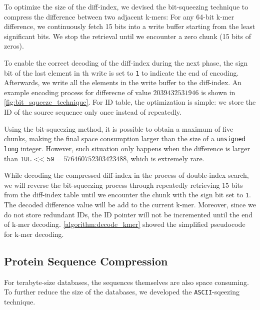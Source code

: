 To optimize the size of the diff-index, we devised the bit-squeezing technique to compress the difference between two adjacent k-mers:
For any 64-bit k-mer difference, we continuously fetch 15 bits into a write buffer starting from the least significant bits. We stop the retrieval until we encounter a zero chunk (15 bits of zeros).

To enable the correct decoding of the diff-index during the next phase, the sign bit of the last element in th write is set to \texttt{1} to indicate the end of encoding. Afterwards, we write all the elements in the write buffer to the diff-index. An example encoding process for differecne of value $2039432531946$ is shown in \autoref{fig:bit_squeeze_technique}. For ID table, the optimization is simple: we store the ID of the source sequence only once instead of repeatedly.

Using the bit-squeezing method, it is possible to obtain a maximum of five chunks, making the final space consumption larger than the size of a \texttt{unsigned long} integer. However, such situation only happens when the difference is larger than $\texttt{1UL << 59} = 576460752303423488$, which is extremely rare.

While decoding the compressed diff-index in the process of double-index search, we will reverse the bit-squeezing process through repeatedly retrieving 15 bits from the diff-index table until we encounter the chunk with the sign bit set to \texttt{1}. The decoded difference value will be add to the current k-mer. Moreover, since we do not store redundant IDs, the ID pointer will not be incremented until the end of k-mer decoding. \cref{algorithm:decode_kmer} showed the simplified pseudocode for k-mer decoding.

\subsection{Protein Sequence Compression}

For terabyte-size databases, the sequences themselves are also space consuming. To further reduce the size of the databases, we developed the \texttt{ASCII}-sqeezing technique.

